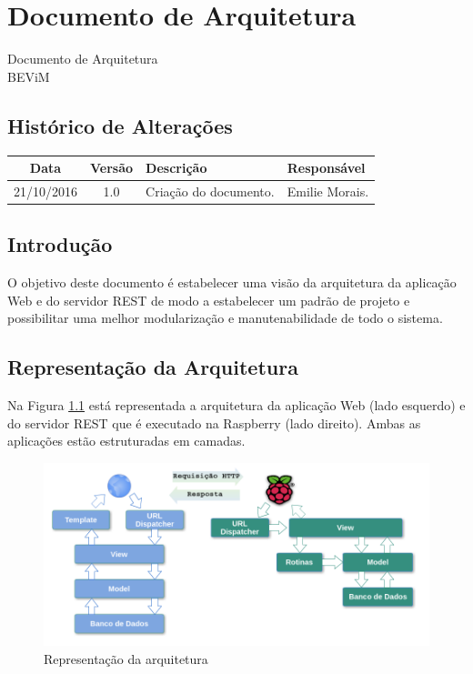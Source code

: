 \chapter{Documento de Arquitetura}

\begin{center}
 {\large Documento de Arquitetura}\\[0.2cm]
 {BEViM}\\
 \end{center}
 
 \section*{Histórico de Alterações}
\begin{table}[h]
\centering
\begin{tabular}{|c|c|p{6cm}|p{5cm}|}
\hline
Data & Versão & Descrição & Responsável\\
\hline                               
21/10/2016 & 1.0 & Criação do documento. & Emilie Morais.\\
\hline
\end{tabular}
\end{table}

\section*{Introdução}
	
    O objetivo deste documento é estabelecer uma visão da arquitetura da aplicação Web e do servidor REST de modo a estabelecer 
    um padrão de projeto e possibilitar uma melhor modularização e manutenabilidade de todo o sistema. 

\section*{Representação da Arquitetura}

Na Figura \ref{fig:representacao_arquitetura} está representada a arquitetura da aplicação Web (lado esquerdo) e do
servidor REST que é executado na Raspberry (lado direito). Ambas as aplicações estão estruturadas em camadas. 

\begin{figure}[!ht]
\centering
\includegraphics[keepaspectratio=true,scale=0.5]{figuras/representacao_arquitetura.png}
\caption{Representação da arquitetura}
\label{fig:representacao_arquitetura} 
\end{figure} 

